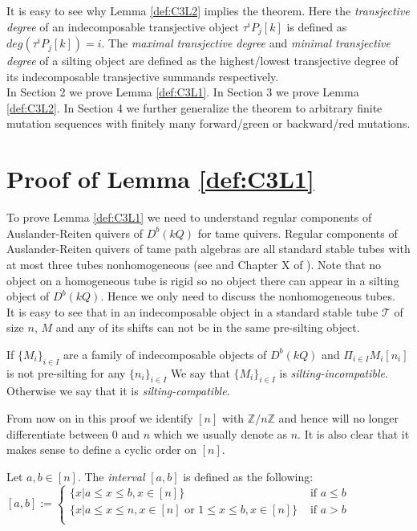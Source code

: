 \indent It is easy to see why Lemma \ref{def:C3L2} implies the theorem. Here the \textit{transjective degree} of an indecomposable transjective object $\tau^iP_j[k]$ is defined as $deg(\tau^iP_j[k])=i$. The \textit{maximal transjective degree} and \textit{minimal transjective degree} of a silting object are defined as the highest/lowest transjective degree of its indecomposable transjective summands respectively.\\
\indent In Section 2 we prove Lemma \ref{def:C3L1}. In Section 3 we prove Lemma \ref{def:C3L2}. In Section 4 we further generalize the theorem to arbitrary finite mutation sequences with finitely many forward/green or backward/red mutations.\\
\section{Proof of Lemma \ref{def:C3L1}}
\indent To prove Lemma \ref{def:C3L1} we need to understand regular components of Auslander-Reiten quivers of $D^b(kQ)$ for tame quivers. Regular components of Auslander-Reiten quivers of tame path algebras are all standard stable tubes with at most three tubes nonhomogeneous (see \cite{DR76} and Chapter X of \cite{SS06}). Note that no object on a homogeneous tube is rigid so no object there can appear in a silting object of $D^b(kQ)$. Hence we only need to discuss the nonhomogeneous tubes.\\
\indent It is easy to see that in an indecomposable object in a standard stable tube $\mathcal{T}$ of size $n$, $M$ and any of its shifts can not be in the same pre-silting object.\\ 
\begin{definition}
If $\{M_i\}_{i\in I}$ are a family of indecomposable objects of $D^b(kQ)$ and $\Pi_{i\in I}M_i[n_i]$ is not pre-silting for any $\{n_i\}_{i\in I}$ We say that $\{M_i\}_{i\in I}$ is \textit{silting-incompatible}. Otherwise we say that it is \textit{silting-compatible}.
\end{definition}
\indent From now on in this proof we identify $[n]$ with $\mathbb{Z}/n\mathbb{Z}$ and hence will no longer differentiate between $0$ and $n$ which we usually denote as $n$. It is also clear that it makes sense to define a cyclic order on $[n]$.\\
\begin{definition}
Let $a,b\in [n]$. The \textit{interval} $[a,b]$ is defined as the following:
$[a,b]:=\begin{cases}
\{x|a\leq x\leq b, x\in [n]\} & \text{ if } a\leq b\\
\{x|a\leq x \leq n, x\in [n] \text{ or }1\leq x \leq b, x\in [n]\} & \text{ if } a > b\\
\end{cases}$
\end{definition}
